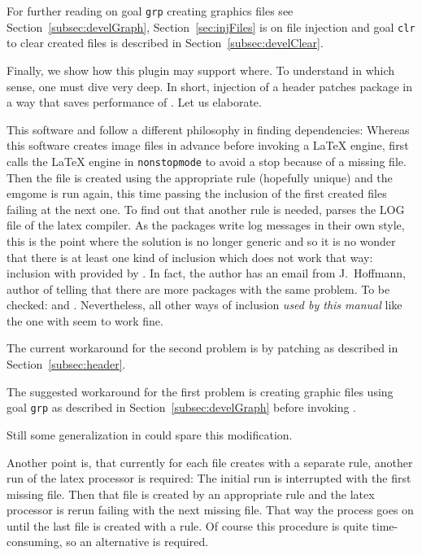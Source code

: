 For further reading on goal \texttt{grp} creating graphics files 
see Section~\ref{subsec:develGraph}, 
Section~\ref{sec:injFiles} is on file injection and 
goal \texttt{clr} to clear created files is 
described in Section~\ref{subsec:develClear}. 
\medskip



Finally, we show how this plugin may support  where. 
To understand in which sense, one must dive very deep. 
In short, injection of a header patches package  
in a way that saves performance of . 
Let us elaborate. 

This software and  follow a different philosophy in finding dependencies: 
Whereas this software creates image files in advance before invoking a \LaTeX{} engine, 
 first calls the \LaTeX{} engine in \texttt{nonstopmode} 
to avoid a stop because of a missing file. 
Then the file is created using the appropriate rule (hopefully unique) 
and the emgome is run again, 
this time passing the inclusion of the first created files 
failing at the next one. 
To find out that another rule is needed,  parses the LOG file of the latex compiler. 
As the packages write log messages in their own style, 
this is the point where the solution is no longer generic 
and so it is no wonder that there is at least one kind of inclusion which does not work that way: 
inclusion with  provided by . 
In fact, the author has an email from J.~Hoffmann, author of  
telling that there are more packages with the same problem. 
To be checked:  and . 
Nevertheless, all other ways of inclusion \emph{used by this manual} 
like the one with  seem to work fine. 

The current workaround for the second problem 
is by patching  as described in Section~\ref{subsec:header}.

The suggested workaround for the first problem is 
creating graphic files using goal \texttt{grp} as described in Section~\ref{subsec:develGraph} 
before invoking . 

Still some generalization in  could spare this modification. 

Another point is, that currently for each file  creates with a separate rule, 
another run of the latex processor is required: 
The initial run is interrupted with the first missing file. 
Then that file is created by an appropriate rule and the latex processor is rerun 
failing with the next missing file. 
That way the process goes on until the last file is created with a rule. 
Of course this procedure is quite time-consuming, so an alternative is required. 



